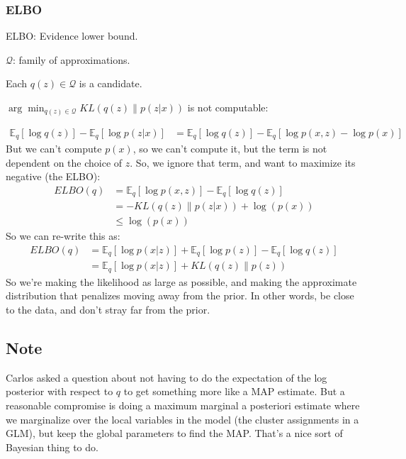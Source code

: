 \documentclass{article}
\begin{document}
\subsubsection{ELBO}
ELBO: Evidence lower bound.

$\mathcal{Q}$: family of approximations.

Each $q(z)\in\mathcal{Q}$ is a candidate.

$\arg\min_{q(z)\in\mathcal{Q}}KL \left(q(z) \middle\| p(z|x)\right)$ is not computable:

\begin{align*}
  \mathbb{E}_q\left[\log q(z)\right] - \mathbb{E}_q\left[\log p(z|x)\right] &= \mathbb{E}_q\left[\log q(z)\right] - \mathbb{E}_q\left[\log p(x,z) - \log p(x)\right]
\end{align*}
But we can't compute $p(x)$, so we can't compute it, but the term is not dependent on the choice of $z$. So, we ignore that term,
and want to maximize its negative (the ELBO):
\begin{align*}
  ELBO(q)&=\mathbb{E}_q\left[\log p(x,z)\right]-\mathbb{E}_q\left[\log q(z)\right]
  \\
  &=-KL \left(q(z) \middle\| p(z|x)\right) + \log(p(x))
  \\
  &\leq \log(p(x))
\end{align*}
So we can re-write this as:
\begin{align*}
  ELBO(q)&=\mathbb{E}_q\left[\log p(x|z)\right]+\mathbb{E}_q\left[\log p(z)\right]-\mathbb{E}_q\left[\log q(z)\right]
  \\
  &=\mathbb{E}_q\left[\log p(x|z)\right]+KL\left(q(z)\middle\|p(z)\right)
\end{align*}
So we're making the likelihood as large as possible, and making the
approximate distribution that penalizes moving away from the prior. In other words,
be close to the data, and don't stray far from the prior.

\subsection{Note}
Carlos asked a question about not having to do the expectation of the log posterior with respect to $q$ to get
something more like a MAP estimate. But a reasonable compromise is doing a maximum marginal a posteriori estimate
where we marginalize over the local variables in the model (the cluster assignments in a GLM), but keep the global
parameters to find the MAP. That's a nice sort of Bayesian thing to do.
\end{document}
